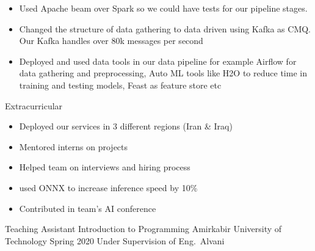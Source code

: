 \begin{cventries}
{\begin{cvitems}
\begin{itemize}
          \item Used Apache beam over Spark so we could have tests for our pipeline stages.
          \item Changed the structure of data gathering to data driven using Kafka as CMQ. Our Kafka handles over 80k messages per second
          \item Deployed and used data tools in our data pipeline for example Airflow for data gathering and preprocessing, Auto ML tools like H2O to reduce time in training and testing models, Feast as feature store etc
        \end{itemize}
        \item Extracurricular
        \begin{itemize}
          \item Deployed our services in 3 different regions (Iran \& Iraq)
          \item Mentored interns on projects
          \item Helped team on interviews and hiring process
          \item used ONNX to increase inference speed by 10\%
          \item Contributed in team's AI conference
        \end{itemize}
      \end{cvitems}
    }

\end{cventries}


\begin{cventries}

  \cventry
    {Teaching Assistant} %
    {Introduction to Programming} %
    {Amirkabir University of Technology} %
    {Spring 2020} %
    {Under Supervision of Eng.~Alvani}

\end{cventries}
